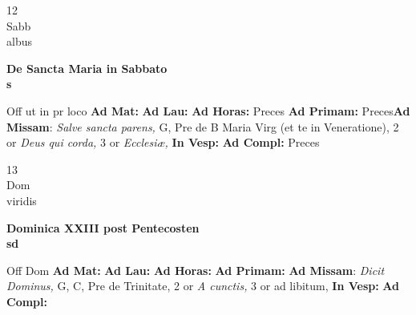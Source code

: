 \documentclass[10pt, openany]{book}
\begin{document}
    \begin{center}
        \begin{minipage}{3.5in}
            \vspace{2em}
            \begin{minipage}{0.5in}
                {\Huge 12} \\
                {\normalsize Sabb} \\
                {\normalsize albus}
            \end{minipage}
            \begin{minipage}{3.0in}
                \textbf{ \large De Sancta Maria in Sabbato \\
                \textnormal{\normalsize s}} \\ 
            \end{minipage}
            \begin{justify}Off ut in pr loco
                \textbf{Ad Mat: }
                \textbf{Ad Lau: }
                \textbf{Ad Horas: }Preces
                \textbf{Ad Primam: }Preces\textbf{Ad Missam}: \textit{Salve sancta parens,} G, Pre de B Maria Virg (et te in Veneratione), 2 or \textit{Deus qui corda,} 3 or \textit{Ecclesiæ,}  
                \textbf{In Vesp: }
                \textbf{Ad Compl: }Preces
            \end{justify}
        \end{minipage}
    \end{center}

    \begin{center}
        \begin{minipage}{3.5in}
            \vspace{2em}
            \begin{minipage}{0.5in}
                {\Huge 13} \\
                {\normalsize Dom} \\
                {\normalsize viridis}
            \end{minipage}
            \begin{minipage}{3.0in}
                \textbf{ \large Dominica XXIII post Pentecosten \\
                \textnormal{\normalsize sd}} \\ 
            \end{minipage}
            \begin{justify}Off Dom
                \textbf{Ad Mat: }
                \textbf{Ad Lau: }
                \textbf{Ad Horas: }
                \textbf{Ad Primam: }\textbf{Ad Missam}: \textit{Dicit Dominus,} G, C, Pre de Trinitate, 2 or \textit{A cunctis,} 3 or ad libitum,  
                \textbf{In Vesp: }
                \textbf{Ad Compl: }
            \end{justify}
        \end{minipage}
    \end{center}
\end{document}
